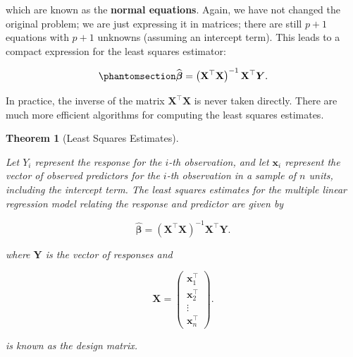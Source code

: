\documentclass[
  letterpaper,
  DIV=11,
  numbers=noendperiod]{scrreprt}
\theoremstyle{definition}
\theoremstyle{plain}
\newtheorem{theorem}{Theorem}[chapter]
\theoremstyle{definition}
\theoremstyle{remark}
\begin{document}
which are known as the \textbf{normal equations}. Again, we have not
changed the original problem; we are just expressing it in matrices;
there are still \(p + 1\) equations with \(p + 1\) unknowns (assuming an
intercept term). This leads to a compact expression for the least
squares estimator:

\begin{equation}\phantomsection\label{eq-reg-lse}{\widehat{\boldsymbol{\beta}} = \left(\mathbf{X}^\top \mathbf{X}\right)^{-1} \mathbf{X}^\top \boldsymbol{Y}.}\end{equation}

\begin{tcolorbox}[enhanced jigsaw, breakable, colframe=quarto-callout-warning-color-frame, titlerule=0mm, arc=.35mm, coltitle=black, opacitybacktitle=0.6, leftrule=.75mm, opacityback=0, left=2mm, toprule=.15mm, colbacktitle=quarto-callout-warning-color!10!white, title=\textcolor{quarto-callout-warning-color}{\faExclamationTriangle}\hspace{0.5em}{Warning}, bottomtitle=1mm, toptitle=1mm, rightrule=.15mm, bottomrule=.15mm, colback=white]

In practice, the inverse of the matrix \(\mathbf{X}^\top \mathbf{X}\) is
never taken directly. There are much more efficient algorithms for
computing the least squares estimates.

\end{tcolorbox}

\begin{theorem}[Least Squares
Estimates]\protect\hypertarget{thm-least-squares-mlr}{}\label{thm-least-squares-mlr}

Let \(Y_i\) represent the response for the \(i\)-th observation, and let
\(\mathbf{x}_i\) represent the vector of observed predictors for the
\(i\)-th observation in a sample of \(n\) units, including the intercept
term. The least squares estimates for the multiple linear regression
model relating the response and predictor are given by

\[\widehat{\boldsymbol{\beta}} = \left(\mathbf{X}^\top \mathbf{X}\right)^{-1} \mathbf{X}^\top \boldsymbol{Y}.\]

where \(\mathbf{Y}\) is the vector of responses and

\[\mathbf{X} = \begin{pmatrix} \mathbf{x}_1^\top \\ \mathbf{x}_2^\top \\ \vdots \\ \mathbf{x}_n^\top \end{pmatrix}.\]

is known as the design matrix.

\end{theorem}
\end{document}

